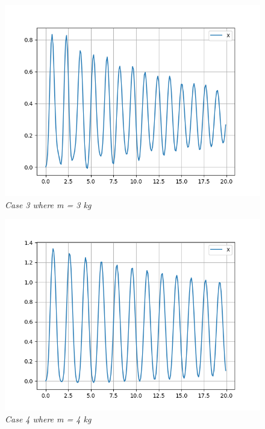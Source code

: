         \begin{figure}[H]
            \centering
            \includegraphics{Appendix/RExpPictures/R/rm3.png}
            \caption{\textit{Case 3 where m = 3 kg}}
            \label{}
        \end{figure}
            
        \begin{figure}[H]
            \centering
            \includegraphics{Appendix/RExpPictures/R/rm5.png}
            \caption{\textit{Case 4 where m = 4 kg}}
            \label{}
        \end{figure}
            

